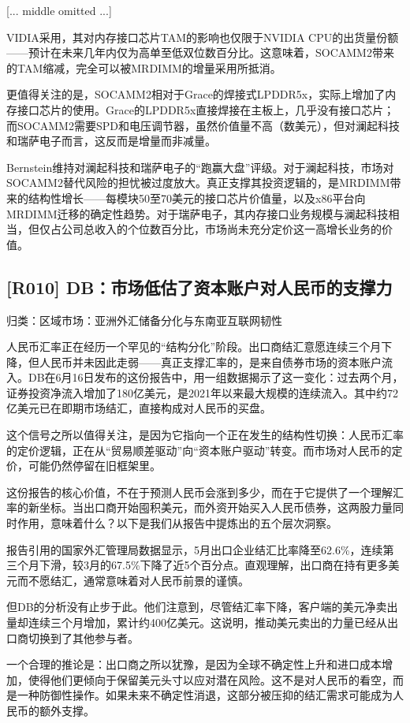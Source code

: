 \documentclass[11pt]{ctexart}
\begin{document}
[... middle omitted ...]

VIDIA采用，其对内存接口芯片TAM的影响也仅限于NVIDIA CPU的出货量份额——预计在未来几年内仅为高单至低双位数百分比。这意味着，SOCAMM2带来的TAM缩减，完全可以被MRDIMM的增量采用所抵消。

更值得关注的是，SOCAMM2相对于Grace的焊接式LPDDR5x，实际上增加了内存接口芯片的使用。Grace的LPDDR5x直接焊接在主板上，几乎没有接口芯片；而SOCAMM2需要SPD和电压调节器，虽然价值量不高（数美元），但对澜起科技和瑞萨电子而言，这反而是增量而非减量。

Bernstein维持对澜起科技和瑞萨电子的“跑赢大盘”评级。对于澜起科技，市场对SOCAMM2替代风险的担忧被过度放大。真正支撑其投资逻辑的，是MRDIMM带来的结构性增长——每模块50至70美元的接口芯片价值量，以及x86平台向MRDIMM迁移的确定性趋势。对于瑞萨电子，其内存接口业务规模与澜起科技相当，但仅占公司总收入的个位数百分比，市场尚未充分定价这一高增长业务的价值。

\subsection{[R010] DB：市场低估了资本账户对人民币的支撑力}
{\small\color{refgray}归类：区域市场：亚洲外汇储备分化与东南亚互联网韧性}

人民币汇率正在经历一个罕见的“结构分化”阶段。出口商结汇意愿连续三个月下降，但人民币并未因此走弱——真正支撑汇率的，是来自债券市场的资本账户流入。DB在6月16日发布的这份报告中，用一组数据揭示了这一变化：过去两个月，证券投资净流入增加了180亿美元，是2021年以来最大规模的连续流入。其中约72亿美元已在即期市场结汇，直接构成对人民币的买盘。

这个信号之所以值得关注，是因为它指向一个正在发生的结构性切换：人民币汇率的定价逻辑，正在从“贸易顺差驱动”向“资本账户驱动”转变。而市场对人民币的定价，可能仍然停留在旧框架里。

这份报告的核心价值，不在于预测人民币会涨到多少，而在于它提供了一个理解汇率的新坐标。当出口商开始囤积美元，而外资开始买入人民币债券，这两股力量同时作用，意味着什么？以下是我们从报告中提炼出的五个层次洞察。

报告引用的国家外汇管理局数据显示，5月出口企业结汇比率降至62.6\%，连续第三个月下滑，较3月的67.5\%下降了近5个百分点。直观理解，出口商在持有更多美元而不愿结汇，通常意味着对人民币前景的谨慎。

但DB的分析没有止步于此。他们注意到，尽管结汇率下降，客户端的美元净卖出量却连续三个月增加，累计约400亿美元。这说明，推动美元卖出的力量已经从出口商切换到了其他参与者。

一个合理的推论是：出口商之所以犹豫，是因为全球不确定性上升和进口成本增加，使得他们更倾向于保留美元头寸以应对潜在风险。这不是对人民币的看空，而是一种防御性操作。如果未来不确定性消退，这部分被压抑的结汇需求可能成为人民币的额外支撑。
\end{document}
